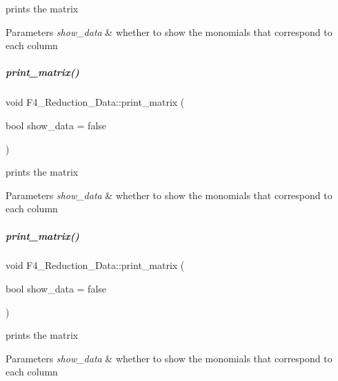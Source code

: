 prints the matrix 


\begin{DoxyParams}{Parameters}
{\em show\+\_\+data} & whether to show the monomials that correspond to each column \\
\hline
\end{DoxyParams}
\mbox{\label{group___g_b_computation_a9f3e9b5617084c34f97acd23d6e67a43}} 
\subparagraph{\texorpdfstring{print\+\_\+matrix()}{print\_matrix()}\hspace{0.1cm}{\footnotesize\ttfamily [2/3]}}
{\footnotesize\ttfamily void F4\+\_\+\+Reduction\+\_\+\+Data\+::print\+\_\+matrix (\begin{DoxyParamCaption}\item[{bool}]{show\+\_\+data = {\ttfamily false} }\end{DoxyParamCaption})}



prints the matrix 


\begin{DoxyParams}{Parameters}
{\em show\+\_\+data} & whether to show the monomials that correspond to each column \\
\hline
\end{DoxyParams}
\mbox{\label{group___g_b_computation_a9f3e9b5617084c34f97acd23d6e67a43}} 
\subparagraph{\texorpdfstring{print\+\_\+matrix()}{print\_matrix()}\hspace{0.1cm}{\footnotesize\ttfamily [3/3]}}
{\footnotesize\ttfamily void F4\+\_\+\+Reduction\+\_\+\+Data\+::print\+\_\+matrix (\begin{DoxyParamCaption}\item[{bool}]{show\+\_\+data = {\ttfamily false} }\end{DoxyParamCaption})}



prints the matrix 


\begin{DoxyParams}{Parameters}
{\em show\+\_\+data} & whether to show the monomials that correspond to each column \\
\hline
\end{DoxyParams}


